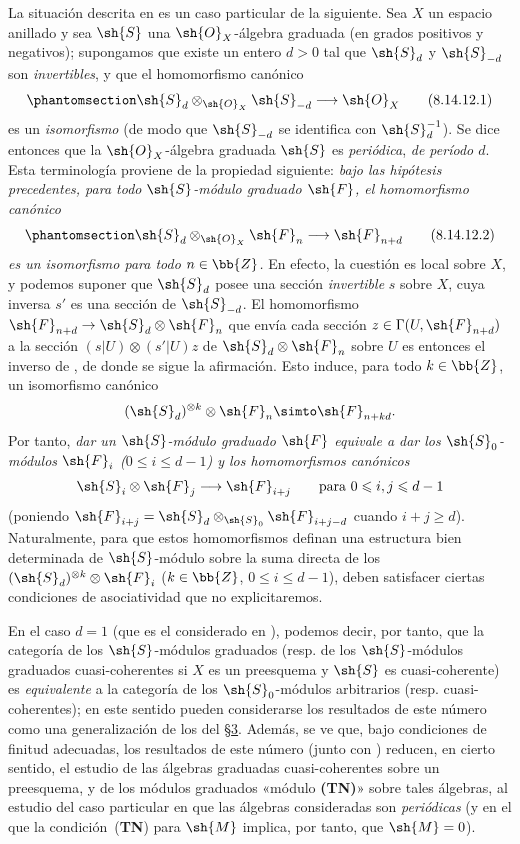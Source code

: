 \documentclass[oneside,10pt]{amsart}
\makeatletter
\renewcommand{\leq}{\leqslant}
\renewcommand{\geq}{\geqslant}
\newcommand{\ega@arrow}[2]{\mathchoice{#1}{#2}{#2}{#2}}
\renewcommand{\to}{\ega@arrow{\longrightarrow}{\rightarrow}}
\let\EGAOriginalLabel\label
\renewcommand{\label}[1]{\phantomsection\EGAOriginalLabel{#1}}
\makeatother
\begin{document}
\begin{remark}[8.14.12]
\label{II.8.14.12}
La situación descrita en  es un caso particular de la siguiente.
Sea $X$ un espacio anillado y sea $\sh{S}$ una $\sh{O}_X$-álgebra graduada (en grados positivos y negativos);
supongamos que existe un entero $d>0$ tal que $\sh{S}_d$ y $\sh{S}_{-d}$ son \emph{invertibles}, y que el homomorfismo canónico
\[
\label{II.8.14.12.1}
    \sh{S}_d\otimes_{\sh{O}_X}\sh{S}_{-d} \to \sh{O}_X
\tag{8.14.12.1}
\]
es un \emph{isomorfismo} (de modo que $\sh{S}_{-d}$ se identifica con $\sh{S}_d^{-1}$).
Se dice entonces que la $\sh{O}_X$-álgebra graduada $\sh{S}$ es \emph{periódica}, \emph{de período $d$}.
Esta terminología proviene de la propiedad siguiente:
\emph{bajo las hipótesis precedentes, para todo $\sh{S}$-módulo graduado $\sh{F}$, el homomorfismo canónico}
\[
\label{II.8.14.12.2}
    \sh{S}_d\otimes_{\sh{O}_X}\sh{F}_n \to \sh{F}_{n+d}
\tag{8.14.12.2}
\]
\emph{es un isomorfismo para todo $n\in\bb{Z}$.}
En efecto, la cuestión es local sobre $X$, y podemos suponer que $\sh{S}_d$ posee una sección \emph{invertible} $s$ sobre $X$, cuya inversa $s'$ es una sección de $\sh{S}_{-d}$.
El homomorfismo $\sh{F}_{n+d}\to\sh{S}_d\otimes\sh{F}_n$ que envía cada sección $z\in\Gamma(U,\sh{F}_{n+d})$ a la sección $(s|U)\otimes(s'|U)z$ de $\sh{S}_d\otimes\sh{F}_n$ sobre $U$ es entonces el inverso de , de donde se sigue la afirmación.
Esto induce, para todo $k\in\bb{Z}$, un isomorfismo canónico
\[
    (\sh{S}_d)^{\otimes k}\otimes\sh{F}_n \simto \sh{F}_{n+kd}.
\]
Por tanto, \emph{dar un $\sh{S}$-módulo graduado $\sh{F}$ equivale a dar los $\sh{S}_0$-módulos $\sh{F}_i$ ($0\leq i\leq d-1$) y los homomorfismos canónicos}
\[
    \sh{S}_i\otimes\sh{F}_j \to \sh{F}_{i+j}
    \qquad
    \mbox{para $0\leq i,j\leq d-1$}
\]
(poniendo $\sh{F}_{i+j}=\sh{S}_d\otimes_{\sh{S}_0}\sh{F}_{i+j-d}$ cuando $i+j\geq d$).
Naturalmente, para que estos homomorfismos definan una estructura bien determinada de $\sh{S}$-módulo sobre la suma directa de los $(\sh{S}_d)^{\otimes k}\otimes\sh{F}_i$ ($k\in\bb{Z}$, $0\leq i\leq d-1$), deben satisfacer ciertas condiciones de asociatividad que no explicitaremos.

En el caso $d=1$ (que es el considerado en ), podemos decir, por tanto, que la categoría de los $\sh{S}$-módulos graduados (resp. de los $\sh{S}$-módulos graduados cuasi-coherentes si $X$ es un preesquema y $\sh{S}$ es cuasi-coherente) es \emph{equivalente} a la categoría de los $\sh{S}_0$-módulos arbitrarios (resp. cuasi-coherentes);
en este sentido pueden considerarse los resultados de este número como una generalización de los del §\hyperref[section:II.3]{3}.
Además, se ve que, bajo condiciones de finitud adecuadas, los resultados de este número (junto con ) reducen, en cierto sentido, el estudio de las álgebras graduadas cuasi-coherentes sobre un preesquema, y de los módulos graduados «módulo \textbf{(TN)}» sobre tales álgebras, al estudio del caso particular en que las álgebras consideradas son \emph{periódicas} (y en el que la condición~(\textbf{TN}) para $\sh{M}$  implica, por tanto, que $\sh{M}=0$).
\end{remark}
\end{document}
